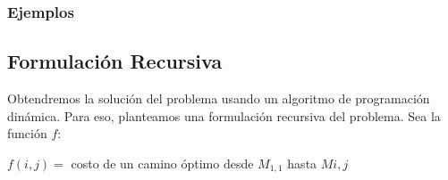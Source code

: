 %
%
%
% 

\subsubsection{Ejemplos}


\subsection{Formulación Recursiva}

Obtendremos la solución del problema usando un algoritmo de programación dinámica. Para eso, planteamos una formulación recursiva del problema. Sea la función $f$:

$f(i,j) = $ costo de un camino óptimo desde $ M_{1,1} $ hasta $ M{i,j}$

